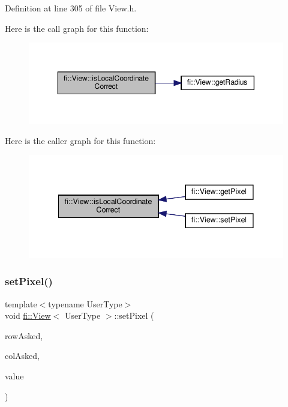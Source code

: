 Definition at line 305 of file View.\+h.

Here is the call graph for this function\+:
\nopagebreak
\begin{figure}[H]
\begin{center}
\leavevmode
\includegraphics[width=350pt]{d5/dd4/classfi_1_1View_a227f31e08d755d67e364967ceb3a1758_cgraph}
\end{center}
\end{figure}
Here is the caller graph for this function\+:
\nopagebreak
\begin{figure}[H]
\begin{center}
\leavevmode
\includegraphics[width=341pt]{d5/dd4/classfi_1_1View_a227f31e08d755d67e364967ceb3a1758_icgraph}
\end{center}
\end{figure}
\mbox{\label{classfi_1_1View_a8ed9ab561cde1f356fab4500e987ad46}} 
\subsubsection{\texorpdfstring{set\+Pixel()}{setPixel()}}
{\footnotesize\ttfamily template$<$typename User\+Type$>$ \\
void \hyperlink{classfi_1_1View}{fi\+::\+View}$<$ User\+Type $>$\+::set\+Pixel (\begin{DoxyParamCaption}\item[{const int32\+\_\+t \&}]{row\+Asked,  }\item[{const int32\+\_\+t \&}]{col\+Asked,  }\item[{const User\+Type \&}]{value }\end{DoxyParamCaption})\hspace{0.3cm}{\ttfamily [inline]}}



